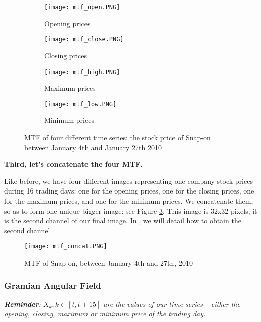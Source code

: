 \documentclass[11pt]{article}
\begin{document}
\begin{onehalfspace}
\begin{figure}[h!]
    \centering
    \captionsetup{justification=centering}
    \begin{subfigure}{0.24\textwidth}
        \texttt{[image: mtf\_open.PNG]}
        \caption{Opening prices}
        \label{fig:open_concat}
    \end{subfigure}
    \begin{subfigure}{0.24\textwidth}
        \texttt{[image: mtf\_close.PNG]}
        \caption{Closing prices}
    \end{subfigure}
    \begin{subfigure}{0.24\textwidth}
        \texttt{[image: mtf\_high.PNG]}
        \caption{Maximum prices}
    \end{subfigure}    
    \begin{subfigure}{0.24\textwidth}
        \texttt{[image: mtf\_low.PNG]}
        \caption{Minimum prices}
    \end{subfigure}
    \caption{MTF of four different time series: the stock price of Snap-on between January 4th and January 27th 2010}
    \label{fig:mtf4}
\end{figure}

\noindent \textbf{Third, let's concatenate the four MTF.}

Like before, we have four different images representing one company stock prices during 16 trading days: one for the opening prices, one for the closing prices, one for the maximum prices, and one for the minimum prices. We concatenate them, so as to form one unique bigger image: see Figure \ref{fig:mtf_concat}. This image is 32x32 pixels, it is the second channel of our final image. In , we will detail how to obtain the second channel.

\begin{figure}[h!]
    \centering
    \captionsetup{justification=centering}
    \texttt{[image: mtf\_concat.PNG]}
    \caption{MTF of Snap-on, between January 4th and 27th, 2010}
\label{fig:mtf_concat}
\end{figure}

\subsubsection{Gramian Angular Field}
\label{sec:gaf}

\textit{\textbf{Reminder}: $X_k, k \in [t, t+15]$ are the values of our time series -- either the opening, closing, maximum or minimum price of the trading day.}


\end{onehalfspace}
\end{document}
